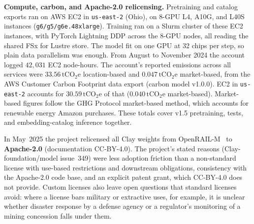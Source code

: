 \textbf{Compute, carbon, and Apache-2.0 relicensing.} Pretraining and catalog exports ran on AWS EC2 in \texttt{us-east-2} (Ohio), on 8-GPU L4, A10G, and L40S instances (\texttt{g6/g5/g6e.48xlarge}). Training ran on a Slurm cluster of these EC2 instances, with PyTorch Lightning DDP across the 8-GPU nodes, all reading the shared FSx for Lustre store. The model fit on one GPU at 32 chips per step, so plain data parallelism was enough. From August to November 2024 the account logged $42{,}031$ EC2 node-hours. The account's reported emissions across all services were $33.56\,\text{tCO}_2\text{e}$ location-based and $0.047\,\text{tCO}_2\text{e}$ market-based, from the AWS Customer Carbon Footprint data export (carbon model v1.0.0). EC2 in \texttt{us-east-2} accounts for $30.59\,\text{tCO}_2\text{e}$ of that ($0.040\,\text{tCO}_2\text{e}$ market-based). Market-based figures follow the GHG Protocol market-based method, which accounts for renewable energy Amazon purchases. These totals cover v1.5 pretraining, tests, and embedding-catalog inference together.

In May~2025 the project relicensed all Clay weights from OpenRAIL-M~\cite{contractor2022rail} to \textbf{Apache-2.0} (documentation CC-BY-4.0). The project's stated reasons (Clay-foundation/model issue~349) were less adoption friction than a non-standard license with use-based restrictions and downstream obligations, consistency with the Apache-2.0 code base, and an explicit patent grant, which CC-BY-4.0 does not provide. Custom licenses also leave open questions that standard licenses avoid: where a license bars military or extractive uses, for example, it is unclear whether disaster response by a defense agency or a regulator's monitoring of a mining concession falls under them.
